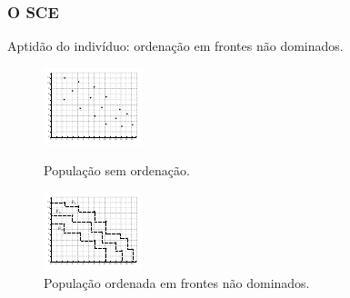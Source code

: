 \documentclass[10pt,xcolor=table,fleqn]{beamer}
\begin{document}
\begin{frame}
	\frametitle{O SCE}
  Aptidão do indivíduo: ordenação em frontes não dominados.
  \begin{figure}
    \centering
    \begin{minipage}[t]{0.48\textwidth}
      \includegraphics[width=\textwidth]{../img/sce/unrankpop}
      \caption{População sem ordenação.}
      \label{img:unrankpop}
    \end{minipage}
    \hfill
    \begin{minipage}[t]{0.48\textwidth}
      \includegraphics[width=\textwidth]{../img/sce/rankpop}
      \caption{População ordenada em frontes não dominados.}
      \label{img:rankpop}
    \end{minipage}
  \end{figure}
\end{frame}
\end{document}
